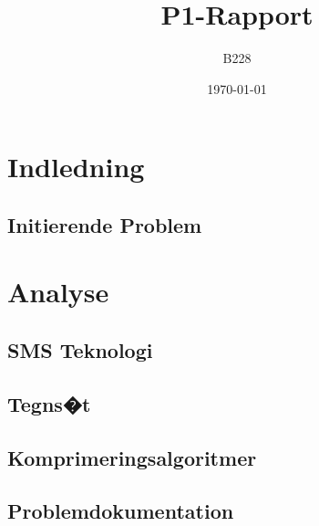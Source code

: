 \documentclass[12pt]{report}
\begin{document}
\setcounter{page}{2}


\begin{titlepage}
\title{P1-Rapport}
\author{B228}
\date{\today}
\pagebreak
\maketitle
\thispagestyle{empty}
\end{titlepage}

\tableofcontents
\thispagestyle{empty}

\renewcommand{\chaptername}{Kapitel}

\chapter{Indledning}
\setcounter{page}{3}
	
	\section{Initierende Problem}
	

\chapter{Analyse}

	\section{SMS Teknologi}
	
	
	\section{Tegns�t}
	
	
	\section{Komprimeringsalgoritmer}
	
	
	\section{Problemdokumentation}
	
	
\end{document}
